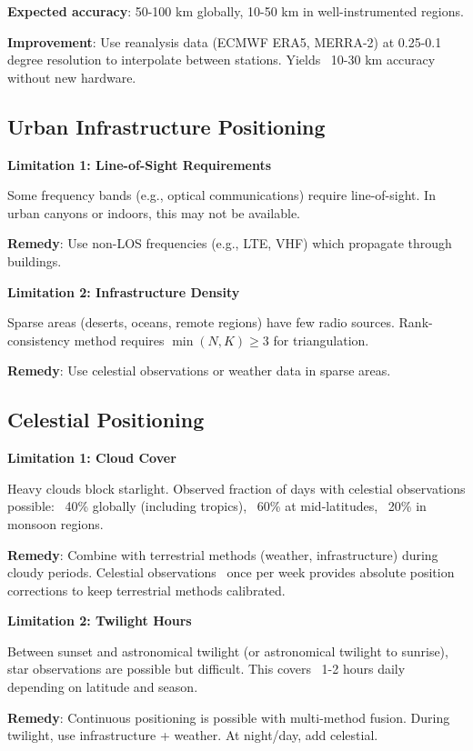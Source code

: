 \documentclass[11pt,twocolumn,a4paper]{article}
\theoremstyle{definition}
\begin{document}
\textbf{Expected accuracy}: 50-100 km globally, 10-50 km in well-instrumented regions.

\textbf{Improvement}: Use reanalysis data (ECMWF ERA5, MERRA-2) at 0.25-0.1 degree resolution to interpolate between stations. Yields ~10-30 km accuracy without new hardware.

\subsection{Urban Infrastructure Positioning}

\textbf{Limitation 1: Line-of-Sight Requirements}

Some frequency bands (e.g., optical communications) require line-of-sight. In urban canyons or indoors, this may not be available.

\textbf{Remedy}: Use non-LOS frequencies (e.g., LTE, VHF) which propagate through buildings.

\textbf{Limitation 2: Infrastructure Density}

Sparse areas (deserts, oceans, remote regions) have few radio sources. Rank-consistency method requires $\min(N,K) \geq 3$ for triangulation.

\textbf{Remedy}: Use celestial observations or weather data in sparse areas.

\subsection{Celestial Positioning}

\textbf{Limitation 1: Cloud Cover}

Heavy clouds block starlight. Observed fraction of days with celestial observations possible: ~40\% globally (including tropics), ~60\% at mid-latitudes, ~20\% in monsoon regions.

\textbf{Remedy}: Combine with terrestrial methods (weather, infrastructure) during cloudy periods. Celestial observations ~once per week provides absolute position corrections to keep terrestrial methods calibrated.

\textbf{Limitation 2: Twilight Hours}

Between sunset and astronomical twilight (or astronomical twilight to sunrise), star observations are possible but difficult. This covers ~1-2 hours daily depending on latitude and season.

\textbf{Remedy}: Continuous positioning is possible with multi-method fusion. During twilight, use infrastructure + weather. At night/day, add celestial.
\end{document}
